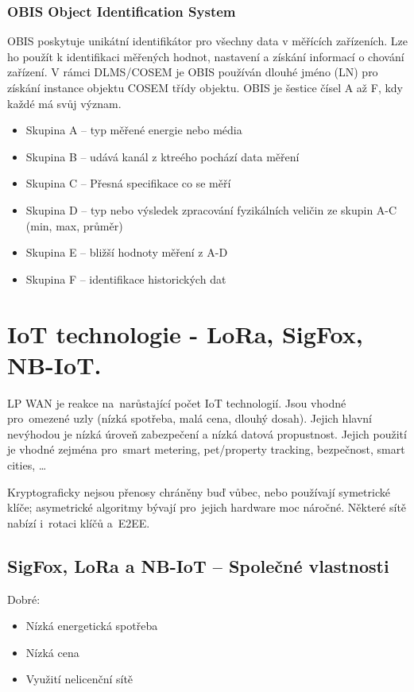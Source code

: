 \subsubsection{OBIS Object Identification System}

OBIS poskytuje unikátní identifikátor pro všechny data v měřících zařízeních.
Lze ho použít k identifikaci měřených hodnot, nastavení a získání informací o chování zařízení.
V rámci DLMS/COSEM je OBIS používán dlouhé jméno (LN) pro získání instance objektu COSEM třídy objektu.
OBIS je šestice čísel A až F, kdy každé má svůj význam.

\begin{itemize}
    \item Skupina A -- typ měřené energie nebo média
    \item Skupina B -- udává kanál z ktreého pochází data měření
    \item Skupina C -- Přesná specifikace co se měří
    \item Skupina D -- typ nebo výsledek zpracování fyzikálních veličin ze skupin A-C (min, max, průměr)
    \item Skupina E -- bližší hodnoty měření z A-D
    \item Skupina F -- identifikace historických dat
\end{itemize}

\clearpage
\section{IoT technologie - LoRa, SigFox, NB-IoT.}

LP WAN je reakce na~narůstající počet IoT technologií.
Jsou vhodné pro~omezené uzly (nízká spotřeba, malá cena, dlouhý dosah).
Jejich hlavní nevýhodou je nízká úroveň zabezpečení a nízká datová propustnost.
Jejich použití je vhodné zejména pro~smart metering, pet/property tracking, bezpečnost, smart cities, \dots

Kryptograficky nejsou přenosy chráněny buď vůbec, nebo používají symetrické klíče; asymetrické algoritmy bývají pro~jejich hardware moc náročné.
Některé sítě nabízí i~rotaci klíčů a~E2EE.

\subsection{SigFox, LoRa a NB-IoT -- Společné vlastnosti}

Dobré:
\begin{itemize}[noitemsep]
    \item Nízká energetická spotřeba
    \item Nízká cena
    \item Využití nelicenční sítě
\end{itemize}

